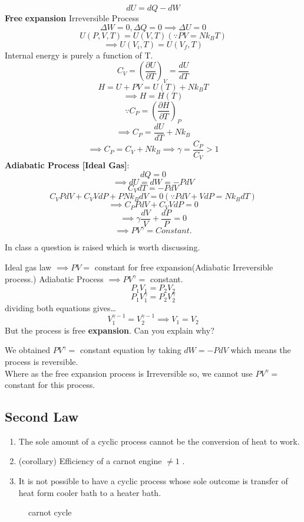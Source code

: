 \[
    dU = dQ - dW
\]
\textbf{Free} \textbf{expansion} 
Irreversible Process
\[
    \Delta W = 0, \Delta Q = 0 \implies \Delta U = 0
\]
\[
    U(P,V,T) = U(V,T) \left(\because PV = Nk_{B}T\right)
\]
\[
    \implies U(V_{i} , T) = U(V_{f} , T)
\]
Internal energy is purely a function of T.
\[
    C_{V} =\left(\frac{\partial U}{\partial T}\right)_{V}  = \frac{dU}{dT}
\]
\[
    H = U + PV = U(T)+N k_{B} T 
\]
\[
    \implies H=H(T) 
\]
\[
   \because C_{P} = \left(\frac{\partial H}{\partial T}\right)_{P} 
\]
\[
   \implies C_P = \frac{dU}{dT} + N k_{B} 
\]
\[
    \implies C_P = C_V + N k_{B} \implies \gamma = \frac{C_{P} }{C_{V}}>1
\]\newpage
\textbf{Adiabatic Process [Ideal Gas]}:\\
\[
    dQ = 0
\]
\[
    \implies dU = dW = -PdV
\]
\[
    C_{V} dT = -P dV
\]
\[
    C_{V} PdV + C_{V} VdP + P N k_{B} dV = 0 \left(\because PdV + VdP = N k_{B} dT \right)
\]
\[
  \implies   C_{P} P dV + C_{V} V dP = 0
\]
\[
    \implies \gamma \frac{dV}{V} + \frac{dP}{P} = 0
\]
\[
    \implies PV^\gamma = Constant.
\]
\begin{note}
    In class a question is raised which is worth discussing.
    \begin{exercise}
        Ideal gas law \(\implies PV = \) constant for free expansion(Adiabatic Irreversible process.)
        Adiabatic Process \(\implies PV^\gamma =\)  constant.
        \[
            P_1 V_1 = P_2 V_2
        \]
        \[
            P_1 V_1 ^ \gamma = P_2 V_2 ^ \gamma
        \]
        dividing both equations gives\dots
        \[
            V_1 ^ {\gamma-1} = V_2 ^ {\gamma -1} \implies V_1 = V_2 
        \]
        But the process is free \textbf{expansion}.
        Can you explain why?
        \begin{answer}
            We obtained \(PV^\gamma =\) constant equation by taking $dW = -PdV$ which means the process is reversible.\\
            Where as the free expansion process is Irreversible so, we cannot use \(PV^\gamma =\) constant for this process.
        \end{answer}
    \end{exercise}
\end{note}
\subsection{Second Law}
\begin{definition}
    \begin{enumerate}
        \item The sole amount of a cyclic process cannot be the conversion of heat to work. 
        \item (corollary) Efficiency of a carnot engine \(\neq  1\) . 
        \item It is not possible to have a cyclic process whose sole outcome is transfer of heat form cooler bath to a heater bath.
    \end{enumerate}
\end{definition}
\begin{figure}[H]
    \centering
    \caption{carnot cycle}
    \label{fig:carnot}
\end{figure}
